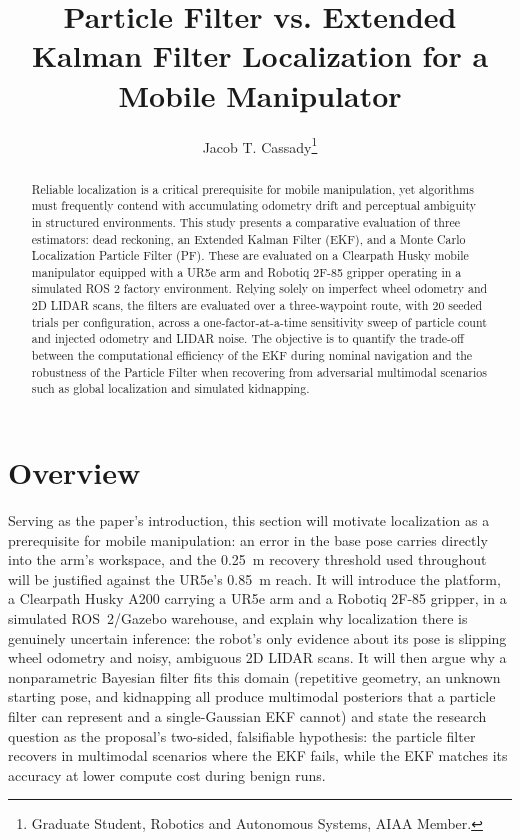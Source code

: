 \documentclass[conf]{new-aiaa}
\title{Particle Filter vs. Extended Kalman Filter Localization for a Mobile Manipulator}
\author{Jacob T. Cassady\footnote{Graduate Student, Robotics and Autonomous Systems, AIAA Member.}}
\affil{Johns Hopkins Whiting School of Engineering, Baltimore, Maryland 21218}
\begin{document}
\maketitle
\begin{abstract}
Reliable localization is a critical prerequisite for mobile manipulation, yet algorithms must frequently contend with accumulating odometry drift and perceptual ambiguity in structured environments. This study presents a comparative evaluation of three estimators: dead reckoning, an Extended Kalman Filter (EKF), and a Monte Carlo Localization Particle Filter (PF). These are evaluated on a Clearpath Husky mobile manipulator equipped with a UR5e arm and Robotiq 2F-85 gripper operating in a simulated ROS 2 factory environment. Relying solely on imperfect wheel odometry and 2D LIDAR scans, the filters are evaluated over a three-waypoint route, with 20 seeded trials per configuration, across a one-factor-at-a-time sensitivity sweep of particle count and injected odometry and LIDAR noise. The objective is to quantify the trade-off between the computational efficiency of the EKF during nominal navigation and the robustness of the Particle Filter when recovering from adversarial multimodal scenarios such as global localization and simulated kidnapping.
\end{abstract}

\section{Overview}\label{sec:Overview}
Serving as the paper's introduction, this section will motivate localization as a prerequisite for mobile manipulation: an error in the base pose carries directly into the arm's workspace, and the 0.25~m recovery threshold used throughout will be justified against the UR5e's 0.85~m reach. It will introduce the platform, a Clearpath Husky A200 carrying a UR5e arm and a Robotiq 2F-85 gripper, in a simulated ROS~2/Gazebo warehouse, and explain why localization there is genuinely uncertain inference: the robot's only evidence about its pose is slipping wheel odometry and noisy, ambiguous 2D LIDAR scans. It will then argue why a nonparametric Bayesian filter fits this domain (repetitive geometry, an unknown starting pose, and kidnapping all produce multimodal posteriors that a particle filter can represent and a single-Gaussian EKF cannot) and state the research question as the proposal's two-sided, falsifiable hypothesis: the particle filter recovers in multimodal scenarios where the EKF fails, while the EKF matches its accuracy at lower compute cost during benign runs.
\end{document}
